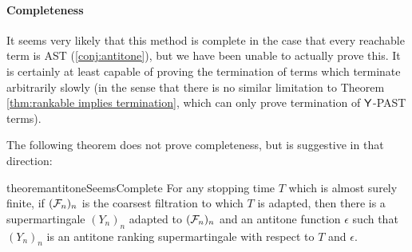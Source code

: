 \paragraph*{Completeness}
It seems very likely that this method is complete in the case that every reachable term is AST (\cref{conj:antitone}), but we have been unable to actually prove this. It is certainly at least capable of proving the termination of terms which terminate arbitrarily slowly (in the sense that there is no similar limitation to Theorem \ref{thm:rankable implies termination}, which can only prove termination of $\mathsf{Y}$-PAST terms).

The following theorem does not prove completeness, but is suggestive in that direction:
\begin{restatable}{theorem}{antitoneSeemsComplete}
For any stopping time $T$ which is almost surely finite, if $(\mathcal{F}_n)_n$ is the coarsest filtration to which $T$ is adapted, then there is a supermartingale $(Y_n)_n$ adapted to $(\mathcal{F}_n)_n$ and an antitone function $\epsilon$ such that $(Y_n)_n$ is an antitone ranking supermartingale with respect to $T$ and $\epsilon$.
\end{restatable}
